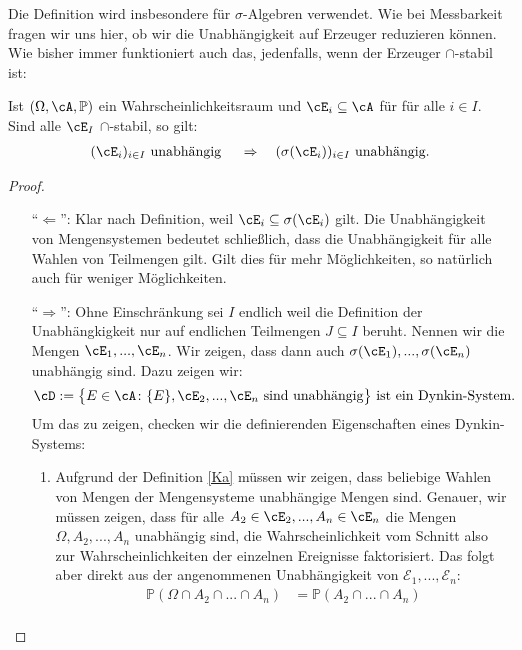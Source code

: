 \marginpar{\textcolor{red}{Vorlesung 24}}
Die Definition wird insbesondere f\"ur $\sigma$-Algebren verwendet. Wie bei Messbarkeit fragen wir uns hier, ob wir die Unabh\"angigkeit auf Erzeuger reduzieren k\"onnen. Wie bisher immer funktioniert auch das, jedenfalls, wenn der Erzeuger $\cap$-stabil ist:
\begin{prop}\label{unabh}
	Ist $(\Omega, \cA, \mathbb{P})$ ein Wahrscheinlichkeitsraum und $\cE_i \subseteq \cA$ für f\"ur alle $i \in I$. Sind alle $\cE_I$ $\cap$-stabil, so gilt:
	\begin{align*}
		(\cE_i)_{i\in I}\text{ unabhängig }\quad \Rightarrow\quad  (\sigma(\cE_i))_{i \in I}\text{ unabhängig.}
	\end{align*}
\end{prop}

\begin{proof}\abs
	\begin{itemize}
		\item[\enquote{$\Leftarrow$}:] Klar nach Definition, weil $\cE_i \subseteq \sigma(\cE_i)$ gilt. Die Unabh\"angigkeit von Mengensystemen bedeutet schlie\ss lich, dass die Unabh\"angigkeit f\"ur alle Wahlen von Teilmengen gilt. Gilt dies f\"ur mehr M\"oglichkeiten, so nat\"urlich auch f\"ur weniger M\"oglichkeiten.
		\item[\enquote{$\Rightarrow$}:] Ohne Einschr\"ankung sei $I$ endlich weil die Definition der Unabh\"angkigkeit nur auf endlichen Teilmengen $J \subseteq I$ beruht. Nennen wir die Mengen $\cE_1,...,\cE_n$. Wir zeigen, dass dann auch $\sigma(\cE_1),...,\sigma(\cE_n)$ unabhängig sind. Dazu zeigen wir:
		$$\cD:= \big\{ E \in \cA \colon \{ E \}, \cE_2, ..., \cE_n \text{ sind unabhängig} \big\}\text{ ist ein Dynkin-System.}$$
		Um das zu zeigen, checken wir die definierenden Eigenschaften eines Dynkin-Systems:
		\begin{enumerate}[label=(\roman*)]
			\item Aufgrund der Definition \ref{Ka} m\"ussen wir zeigen, dass beliebige Wahlen von Mengen der Mengensysteme unabh\"angige Mengen sind. Genauer, wir m\"ussen zeigen, dass f\"ur alle $ A_2 \in \cE_2,...,A_n \in \cE_n$ die Mengen $\Omega, A_2,...,A_n$ unabhängig sind, die Wahrscheinlichkeit vom Schnitt also zur Wahrscheinlichkeiten der einzelnen Ereignisse faktorisiert. Das folgt aber direkt aus der angenommenen Unabh\"angigkeit von $\mathcal E_1, ..., \mathcal E_n$:			
			\begin{align*}
				\mathbb{P}(\Omega \cap A_2 \cap ... \cap A_n) &= \mathbb{P}(A_2 \cap ... \cap A_n)\\

\end{align*}
\end{enumerate}
\end{itemize}
\end{proof}
